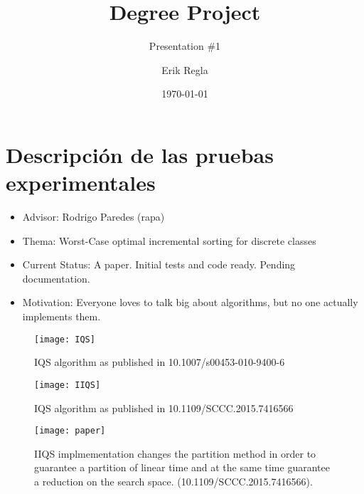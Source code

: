 \documentclass{beamer}
\title[Degree Project]{Degree Project}
\subtitle{Presentation \#1}
\author[E. Regla]{Erik Regla}
\institute[UTalca]{Universidad de Talca}
\date{\today}
\begin{document}
\begin{frame}
  \titlepage
\end{frame}

\section{Descripción de las pruebas experimentales}

\begin{frame}
  \begin{itemize}
  	\item Advisor: Rodrigo Paredes (rapa)
  	\item Thema: Worst-Case optimal incremental sorting for discrete classes
  	\item Current Status: A paper. Initial tests and code ready. Pending documentation.
  	\item Motivation: Everyone loves to talk big about algorithms, but no one actually implements them.
  \end{itemize}
\end{frame}

\begin{frame}
    \centering
    \begin{figure}
        \texttt{[image: IQS]}\\
        \caption{IQS algorithm as published in 10.1007/s00453-010-9400-6}
    \end{figure}
\end{frame}

\begin{frame}
    \centering
    \begin{figure}
        \texttt{[image: IIQS]}\\
        \caption{IQS algorithm as published in 10.1109/SCCC.2015.7416566}
    \end{figure}
\end{frame}


\begin{frame}
    \centering
    \begin{figure}
        \texttt{[image: paper]}\\
        \caption{IIQS implmementation changes the partition method in order to guarantee a partition of linear time and at the same time guarantee a reduction on the search space. (10.1109/SCCC.2015.7416566).}
    \end{figure}
\end{frame}
\end{document}
